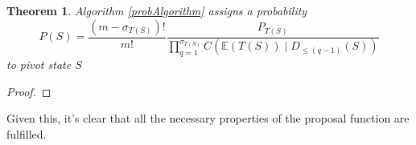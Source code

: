 \documentclass{article}
\newtheorem{theorem}{Theorem}
\begin{document}
\begin{theorem}
Algorithm \ref{probAlgorithm} assigns a probability
\[
P(S) =  \frac{(m-\sigma_{T(S)})!}{m!} \frac{P_{T(S)}}{\prod_{q=1}^{\sigma_{T(S)}} C(\mathbb{E}(T(S)) \mid D_{\le (q-1)}(S))}
\]
to pivot state $S$
\end{theorem}
\begin{proof}
\end{proof}



Given this, it's clear that all the necessary properties of the proposal function are fulfilled.

%
% 


\end{document}
